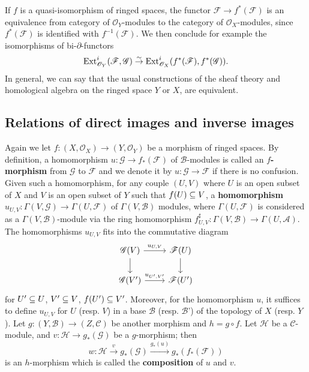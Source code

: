 \begin{remark}
If $f$ is a quasi-isomorphism of ringed spaces, the functor $\mathscr{F}\to f^*(\mathscr{F})$ is an equivalence from category of $\mathscr{O}_Y$-modules to the category of $\mathscr{O}_X$-modules, since $f^*(\mathscr{F})$ is identified with $f^{-1}(\mathscr{F})$. We then conclude for example the isomorphisms of bi-$\partial$-functors
\[\mathrm{Ext}^i_{\mathscr{O}_Y}(\mathscr{F},\mathscr{G})\stackrel{\sim}{\to}\mathrm{Ext}^i_{\mathscr{O}_X}(f^*(\mathscr{F}),f^*(\mathscr{G})).\]
In general, we can say that the usual constructions of the sheaf theory and homological algebra on the ringed space $Y$ or $X$, are equivalent.
\end{remark}
\subsection{Relations of direct images and inverse images}
Again we let $f:(X,\mathscr{O}_X)\to (Y,\mathscr{O}_Y)$ be a morphism of ringed spaces. By definition, a homomorphism $u:\mathscr{G}\to f_*(\mathscr{F})$ of $\mathscr{B}$-modules is called an \textbf{$f$-morphism} from $\mathscr{G}$ to $\mathscr{F}$ and we denote it by $u:\mathscr{G}\to\mathscr{F}$ if there is no confusion. Given such a homomorphism, for any couple $(U,V)$ where $U$ is an open subset of $X$ and $V$ is an open subset of $Y$ such that $f(U)\subseteq V$, a \textbf{homomorphism} $u_{U,V}:\Gamma(V,\mathscr{G})\to\Gamma(U,\mathscr{F})$ of $\Gamma(V,\mathscr{B})$ modules, where $\Gamma(U,\mathscr{F})$ is considered as a $\Gamma(V,\mathscr{B})$-module via the ring homomorphism $f^{\sharp}_{U,V}:\Gamma(V,\mathscr{B})\to\Gamma(U,\mathscr{A})$. The homomorphisms $u_{U,V}$ fits into the commutative diagram
\[\begin{tikzcd}
\mathscr{G}(V)\ar[r,"u_{U,V}"]\ar[d]&\mathscr{F}(U)\ar[d]\\
\mathscr{G}(V')\ar[r,"u_{U',V'}"]&\mathscr{F}(U')
\end{tikzcd}\]
for $U'\subseteq U$, $V'\subseteq V$, $f(U')\subseteq V'$. Moreover, for the homomorphism $u$, it suffices to define $u_{U,V}$ for $U$ (resp. $V$) in a base $\mathcal{B}$ (resp. $\mathcal{B}$') of the topology of $X$ (resp. $Y$). Let $g:(Y,\mathscr{B})\to(Z,\mathscr{C})$ be another morphism and $h=g\circ f$. Let $\mathscr{H}$ be a $\mathscr{C}$-module, and $v:\mathscr{H}\to g_*(\mathscr{G})$ be a $g$-morphism; then
\[w:\mathscr{H}\stackrel{v}{\longrightarrow}g_*(\mathscr{G})\stackrel{g_*(u)}{\longrightarrow}g_*(f_*(\mathscr{F}))\]
is an $h$-morphism which is called the \textbf{composition} of $u$ and $v$.\par
